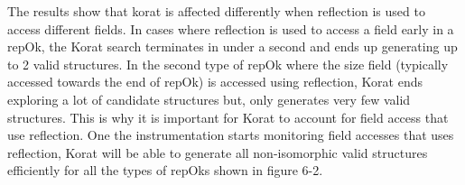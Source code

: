 \par
The results show that korat is affected differently when reflection is used to access different fields. In cases where reflection is used to access a field early in a repOk, the Korat search terminates in under a second and ends up generating up to 2 valid structures. In the second type of repOk where the size field (typically accessed towards the end of repOk) is accessed using reflection, Korat ends exploring a lot of candidate structures but, only generates very few valid structures. This is why it is important for Korat to account for field access that use reflection. One the instrumentation starts monitoring field accesses that uses reflection, Korat will be able to generate all non-isomorphic valid structures efficiently for all the types of repOks shown in figure 6-2.

